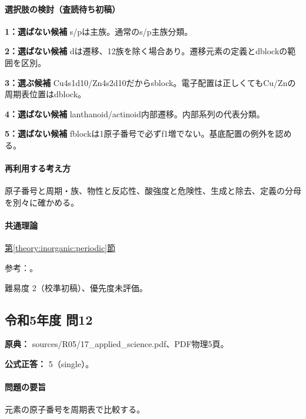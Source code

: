 \paragraph{選択肢の検討（査読待ち初稿）}\mbox{}\par

\noindent\textbf{1：選ばない候補} s/pは主族。通常のs/p主族分類。\par

\noindent\textbf{2：選ばない候補} dは遷移、12族を除く場合あり。遷移元素の定義とdblockの範囲を区別。\par

\noindent\textbf{3：選ぶ候補} Cu4s1d10/Zn4s2d10だからsblock。電子配置は正しくてもCu/Znの周期表位置はdblock。\par

\noindent\textbf{4：選ばない候補} lanthanoid/actinoid内部遷移。内部系列の代表分類。\par

\noindent\textbf{5：選ばない候補} fblockは1原子番号で必ずf1増でない。基底配置の例外を認める。\par

\paragraph{再利用する考え方} 原子番号と周期・族、物性と反応性、酸強度と危険性、生成と除去、定義の分母を別々に確かめる。

\paragraph{共通理論} \hyperref[theory:inorganic:periodic]{第\ref*{theory:inorganic:periodic}節}

\par 参考：\cite{atomic_nist2019}。

\par 難易度 2（校準初稿）、優先度未評価。

\subsection{令和5年度 問12}
\label{q:r05-reg-applied-12}

\noindent\textbf{原典：} sources/R05/17\_applied\_science.pdf、PDF物理5頁。

\textbf{公式正答：} 5（single）。

\paragraph{問題の要旨} 元素の原子番号を周期表で比較する。

